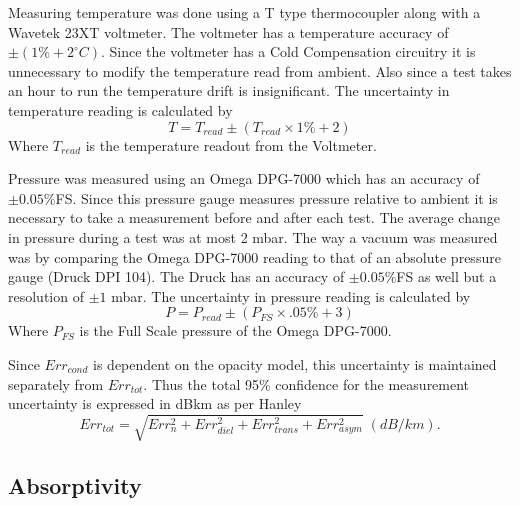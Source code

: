 Measuring temperature was done using a T type thermocoupler along with a Wavetek 23XT voltmeter. The voltmeter has a temperature accuracy of $\pm (1\% + 2^\circ C)$. Since the voltmeter has a Cold Compensation circuitry it is unnecessary to modify the temperature read from ambient. Also since a test takes an hour to run the temperature drift is insignificant. The uncertainty in temperature reading is calculated by
\begin{equation}
T = T_{read} \pm ( T_{read} \times 1\% + 2)
\end{equation}
Where $T_{read}$ is the temperature readout from the Voltmeter.

Pressure was measured using an Omega DPG-7000 which has an accuracy of $\pm 0.05\%$FS. Since this pressure gauge measures pressure relative to ambient it is necessary to take a measurement before and after each test. The average change in pressure during a test was at most 2 mbar. The way a vacuum was measured was by comparing the Omega DPG-7000 reading to that of an absolute pressure gauge (Druck DPI 104). The Druck has an accuracy of $\pm 0.05\%$FS as well but a resolution of $\pm 1$ mbar. The uncertainty in pressure reading is calculated by
\begin{equation}
P = P_{read} \pm ( P_{FS} \times .05\% + 3)
\end{equation}
Where $P_{FS}$ is the Full Scale pressure of the Omega DPG-7000.

Since $Err_{cond}$ is dependent on the opacity model, this uncertainty is maintained separately from $Err_{tot}$. Thus the total 95\% confidence for the measurement uncertainty is expressed in dB\/km as per Hanley \cite{Hanley-thesis}
\begin{equation}
Err_{tot} = \sqrt{Err_n^2 + Err_{diel}^2 + Err_{trans}^2 + Err_{asym}^2} \;(dB/km).
\end{equation}

\subsection{Absorptivity}
